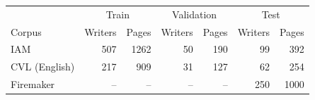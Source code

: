 \begin{tabular}{lrrrrrr}
\toprule
& \multicolumn{2}{c}{Train} & \multicolumn{2}{c}{Validation} & \multicolumn{2}{c}{Test} \\
Corpus & Writers & Pages & Writers & Pages & Writers & Pages \\
\midrule
IAM & 507 & 1262 & 50 & 190 & 99 & 392 \\
CVL (English) & 217 & 909 & 31 & 127 & 62 & 254 \\
Firemaker & -- & -- & -- & -- & 250 & 1000 \\
\bottomrule
\end{tabular}
